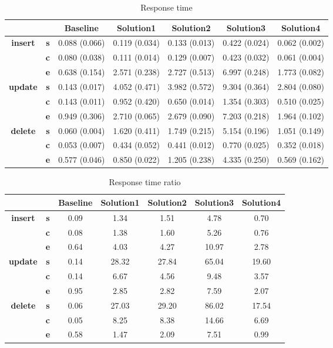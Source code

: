 \begin{table}[h]
\centering
\caption{Response time}\label{t:}
\begin{tabular}{ccccccc}
\toprule
&&\textbf{Baseline} & \textbf{Solution1} & \textbf{Solution2} & \textbf{Solution3} & \textbf{Solution4}\\
\midrule
\multirow{3}{*}{\textbf{insert}} & \textbf{s} & 0.088 (0.066) & 0.119 (0.034) & 0.133 (0.013) & 0.422 (0.024) & 0.062 (0.002)\\
 & \textbf{c} & 0.080 (0.038) & 0.111 (0.014) & 0.129 (0.007) & 0.423 (0.032) & 0.061 (0.004)\\
 & \textbf{e} & 0.638 (0.154) & 2.571 (0.238) & 2.727 (0.513) & 6.997 (0.248) & 1.773 (0.082)\\
\midrule
\multirow{3}{*}{\textbf{update}} & \textbf{s} & 0.143 (0.017) & 4.052 (0.471) & 3.982 (0.572) & 9.304 (0.364) & 2.804 (0.080)\\
 & \textbf{c} & 0.143 (0.011) & 0.952 (0.420) & 0.650 (0.014) & 1.354 (0.303) & 0.510 (0.025)\\
 & \textbf{e} & 0.949 (0.306) & 2.710 (0.065) & 2.679 (0.090) & 7.203 (0.218) & 1.964 (0.102)\\
\midrule
\multirow{3}{*}{\textbf{delete}} & \textbf{s} & 0.060 (0.004) & 1.620 (0.411) & 1.749 (0.215) & 5.154 (0.196) & 1.051 (0.149)\\
 & \textbf{c} & 0.053 (0.007) & 0.434 (0.052) & 0.441 (0.012) & 0.770 (0.025) & 0.352 (0.018)\\
 & \textbf{e} & 0.577 (0.046) & 0.850 (0.022) & 1.205 (0.238) & 4.335 (0.250) & 0.569 (0.162)\\
\bottomrule
\end{tabular}
\end{table}



\begin{table}[h]
\centering
\caption{Response time ratio}\label{t:}
\begin{tabular}{ccccccc}
\toprule
&&\textbf{Baseline} & \textbf{Solution1} & \textbf{Solution2} & \textbf{Solution3} & \textbf{Solution4}\\
\midrule
\multirow{3}{*}{\textbf{insert}} & \textbf{s} & 0.09 & 1.34 & 1.51 & 4.78 & 0.70\\
 & \textbf{c} & 0.08 & 1.38 & 1.60 & 5.26 & 0.76\\
 & \textbf{e} & 0.64 & 4.03 & 4.27 & 10.97 & 2.78\\
\midrule
\multirow{3}{*}{\textbf{update}} & \textbf{s} & 0.14 & 28.32 & 27.84 & 65.04 & 19.60\\
 & \textbf{c} & 0.14 & 6.67 & 4.56 & 9.48 & 3.57\\
 & \textbf{e} & 0.95 & 2.85 & 2.82 & 7.59 & 2.07\\
\midrule
\multirow{3}{*}{\textbf{delete}} & \textbf{s} & 0.06 & 27.03 & 29.20 & 86.02 & 17.54\\
 & \textbf{c} & 0.05 & 8.25 & 8.38 & 14.66 & 6.69\\
 & \textbf{e} & 0.58 & 1.47 & 2.09 & 7.51 & 0.99\\
\bottomrule
\end{tabular}
\end{table}






